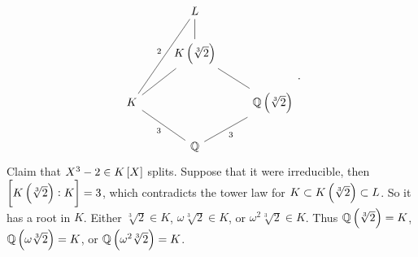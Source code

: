 $$
\begin{tikzcd}
& L & \\
& K\br{\sqrt[3]{2}} \arrow[dash]{u} & \\
K \arrow[dash]{uur}{2} \arrow[dash]{ur} & & \QQ\br{\sqrt[3]{2}} \arrow[dash]{ul} \\
& \QQ \arrow[dash]{ul}{3} \arrow[dash, swap]{ur}{3} &
\end{tikzcd}.
$$
Claim that $ X^3 - 2 \in K\sbr{X} $ splits. Suppose that it were irreducible, then $ \sbr{K\br{\sqrt[3]{2}} : K} = 3 $, which contradicts the tower law for $ K \subset K\br{\sqrt[3]{2}} \subset L $. So it has a root in $ K $. Either $ \sqrt[3]{2} \in K $, $ \omega\sqrt[3]{2} \in K $, or $ \omega^2\sqrt[3]{2} \in K $. Thus $ \QQ\br{\sqrt[3]{2}} = K $, $ \QQ\br{\omega\sqrt[3]{2}} = K $, or $ \QQ\br{\omega^2\sqrt[3]{2}} = K $.

\pagebreak


